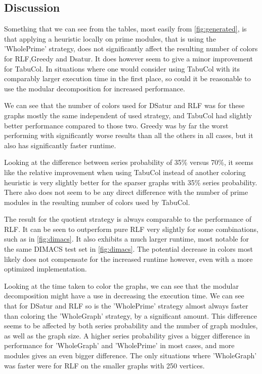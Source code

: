 \documentclass[a4paper]{article}
\begin{document}
\FloatBarrier
\subsection{Discussion}

Something that we can see from the tables, most easily from
\autoref{fig:generated}, is that applying a heuristic locally on prime modules,
that is using the 'WholePrime' strategy,
does not significantly affect the resulting number of colors for RLF,Greedy and Dsatur. It
does however seem to give a minor improvement for TabuCol. In situations where
one would consider using TabuCol with its comparably larger execution time in
the first place, so could it be reasonable to use the modular decomposition for
increased performance.

We can see that the number of  colors used for DSatur and RLF was for these
graphs mostly the same independent of used strategy, and TabuCol had slightly better performance compared to
those two. Greedy was by far the worst performing with significantly worse
results than all the others in all cases, but it also has significantly faster runtime.

Looking at the difference between series probability of 35\% versus 70\%, it
seems like the relative improvement when using TabuCol instead of another
coloring heuristic is very slightly better for the sparser
graphs with 35\% series probability. There also does not seem to be any direct
difference with the number of prime modules in the resulting number of colors used by TabuCol.

The result for the quotient strategy is always comparable to the performance
of RLF. It can be seen to outperform pure RLF very slightly for some
combinations, such as in \autoref{fig:dimacs}. It also exhibits a much larger
runtime, most notable for the same DIMACS test set in \autoref{fig:dimacs}.  The
potential decrease in colors most likely does not compensate for the increased
runtime however, even with a more optimized implementation.

Looking at the time taken to color the graphs, we can see that the modular
decomposition might have a use in decreasing the execution time.  We can see
that for DSatur and RLF so is the 'WholePrime' strategy almost always faster
than coloring the 'WholeGraph' strategy, by a significant amount. This difference seems to be affected
by both series probability and the number of graph modules, as well as the graph size.
A higher series probability gives a bigger difference in performance for
'WholeGraph' and 'WholePrime' in most cases, and more modules gives an even bigger
difference. The only situations where 'WholeGraph' was faster were for RLF on the smaller graphs 
with 250 vertices.
\end{document}
